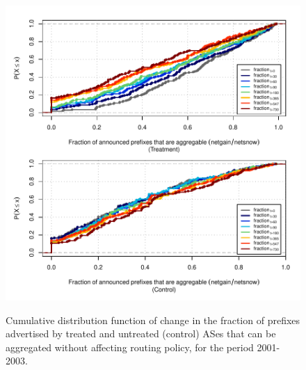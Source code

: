 \clearpage
\vspace*{16pt}
\begin{figure}[H]
\begin{centering}
\begin{singlespace}
\captionsetup{list=no}
    \includegraphics[width=6in]{figures/behavior-frac_deagg-2001_2003-corr.pdf}
    \vspace{-2em}\\
    \caption{Cumulative distribution function of change in the fraction of
    prefixes advertised by treated and untreated (control) ASes that can be
    aggregated without affecting routing policy, for the period 2001-2003.}
\end{singlespace}
\end{centering}
\end{figure}


